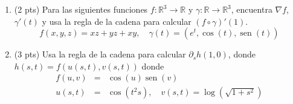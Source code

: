 \documentclass[12pt]{article}
\newcommand{\sen}{\operatorname{sen}}
\begin{document}
\bigskip

            
\bigskip
\bigskip
\bigskip


\begin{enumerate}

  
\item(2 pts) Para las siguientes funciones $f:\mathbb{R}^3 \to \mathbb{R}$ y
  $\gamma:\mathbb{R}\to \mathbb{R}^3$, encuentra $\nabla f $, $\gamma'(t)$ y usa la regla de la
  cadena para calcular $(f\circ \gamma)'(1)$.
  $$f(x,y,z)=xz+yz+xy, \quad \gamma(t)=(e^t,\cos(t),\sen(t))$$
 
 


  \vspace{3cm}

\item(3 pts) Usa la regla de la cadena para calcular $\partial_sh(1,0)$, donde
  $h(s,t)=f(u(s,t),v(s,t))$ donde
  \begin{eqnarray*}
    f(u,v)&=&\cos(u)\sen(v)\\
    u(s,t)&=&\cos(t^2s),\quad v(s,t)= \log(\sqrt{1+s^2})
  \end{eqnarray*}
  
\end{enumerate}


  
\end{document}

